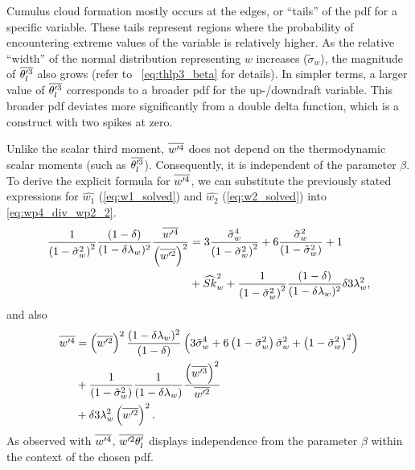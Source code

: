 Cumulus cloud formation mostly occurs at the edges,
or \enquote{tails} of the \gls{pdf} for a specific variable.
These tails represent regions where the probability of encountering extreme values of the variable is relatively higher.
As the relative \enquote{width} of the normal distribution representing $w$ increases ($\tilde{\sigma}_w$),
the magnitude of $\overline{\theta_l'^3}$ also grows (refer to ~\eqref{eq:thlp3_beta} for details).
In simpler terms, a larger value of $\overline{\theta_l'^3}$ corresponds to a broader \gls{pdf} for the up-/downdraft variable.
This broader \gls{pdf} deviates more significantly from a double delta function,
which is a construct with two spikes at zero.

Unlike the scalar third moment,
$\overline{w'^4}$ does not depend on the thermodynamic scalar moments (such as $\overline{\theta_l'^3}$).
Consequently, it is independent of the parameter $\beta$.
To derive the explicit formula for $\overline{w'^4}$,
we can substitute the previously stated expressions for $\widehat{w_1}$ (\cref{eq:w1_solved})
and $\widehat{w_2}$ (\cref{eq:w2_solved}) into \cref{eq:wp4_div_wp2_2}.
\begin{align}
    \label{eq:wp4_div_wp2_2_solved}
    \frac{1}{\left( 1 - \tilde{\sigma}_w^2 \right)^2} \frac{(1-\delta)}{(1-\delta \lambda_w)^2} \frac{\overline{w'^4}}{\left(\overline{w'^2}\right)^2}
    &= 3 \frac{{\tilde{\sigma}_w}^4}{\left( 1 - \tilde{\sigma}_w^2 \right)^2} + 6 \frac{{\tilde{\sigma}_w}^2}{\left( 1 - \tilde{\sigma}_w^2 \right)} + 1 \nonumber\\
    &+ \widehat{Sk}_w^2 + \frac{1}{\left( 1 - \tilde{\sigma}_w^2 \right)^2} \frac{(1-\delta)}{(1-\delta \lambda_w)^2} \delta 3 \lambda_w^2,
\end{align}
and also
\begin{align}
    \label{eq:wp4}
    \overline{w'^4}
    &= \left(\overline{w'^2}\right)^2
    \frac{(1-\delta \lambda_w)^2}{(1-\delta)}
    \left(3 \tilde{\sigma}_w^4 + 6 \left( 1 - \tilde{\sigma}_w^2 \right) \tilde{\sigma}_w^2 + \left( 1 - \tilde{\sigma}_w^2 \right)^2\right) \nonumber\\
    &+ \frac{1}{\left( 1 - \tilde{\sigma}_w^2 \right)} \frac{1}{(1-\delta \lambda_w)}
    \frac{\left(\overline{w'^3}\right)^2}{\overline{w'^2}} \nonumber\\
    &+ \delta 3 \lambda_w^2 \left(\overline{w'^2}\right)^2.
\end{align}
As observed with $\overline{w'^4}$,
$\overline{w'^2 \theta_l'}$ displays independence from the parameter $\beta$
within the context of the chosen \gls{pdf}.

